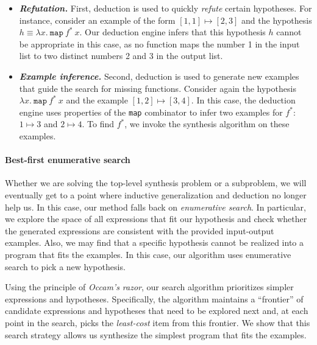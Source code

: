 \begin{itemize} 
\item {\bf \emph{Refutation.}} First, deduction is used to quickly \emph{refute} certain
hypotheses. %
For instance, consider
an example of the form $[1, 1] \mapsto [2, 3]$ and the hypothesis $ h
\equiv \lambda x.\ \texttt{map}\ f^*\ x$. Our deduction engine infers
that this hypothesis $h$ cannot  be appropriate in this case,
as no function maps the number 1 in the input list to two
distinct numbers 2 and 3 in the output list.

\item{\bf \emph{Example inference.}} Second, deduction is used to
  generate new examples that guide the search for missing
  functions. Consider again the hypothesis $\lambda x.\ \texttt{map}\
  f^*\ x$ and the example $[1, 2] \mapsto [3, 4]$. In this case, the
  deduction engine uses properties of the \texttt{map} combinator to
  infer two examples for $f^*$: $1 \mapsto 3$ and $2 \mapsto 4$.  To
  find $f^*$, we invoke the synthesis algorithm on these examples.
\end{itemize}

\paragraph{Best-first enumerative search} 

Whether we are solving the top-level synthesis problem or a
subproblem, we will eventually get to a point where inductive
generalization and deduction no longer help us. In this case, our
method falls back on {\em enumerative search}.  In particular, we
explore the space of all expressions that fit our hypothesis and check
whether the generated expressions are consistent with the provided
input-output examples. Also, we may find that a specific hypothesis
cannot be realized into a program that fits the examples. In this
case, our algorithm uses enumerative search to pick a new hypothesis.

Using the principle of \emph{Occam's razor}, our search algorithm
prioritizes simpler expressions and hypotheses. Specifically, the algorithm
maintains a ``frontier'' of candidate expressions and hypotheses that
need to be explored next and, at each point in the search, picks the
{\em least-cost} item from this frontier.
We show that this search strategy allows us synthesize the simplest
program that fits the examples.


